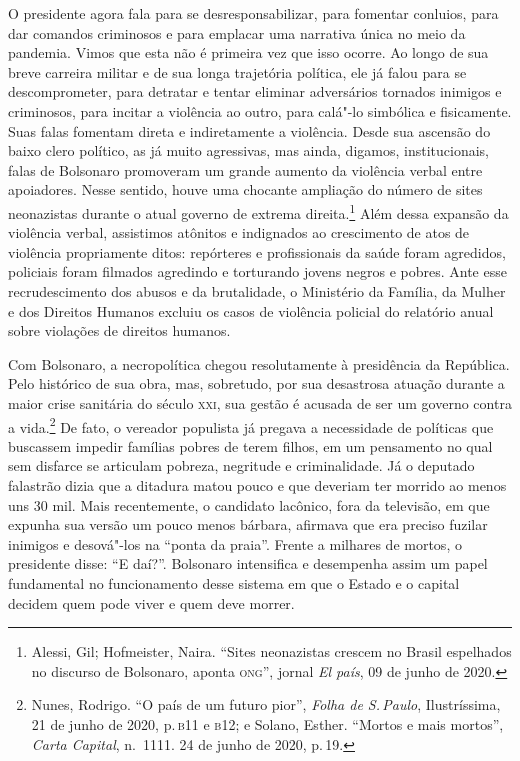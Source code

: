 O presidente agora fala para se desresponsabilizar, para fomentar
conluios, para dar comandos criminosos e para emplacar uma narrativa
única no meio da pandemia. Vimos que esta não é primeira vez que isso
ocorre. Ao longo de sua breve carreira militar e de sua longa trajetória
política, ele já falou para se descomprometer, para detratar e tentar
eliminar adversários tornados inimigos e criminosos, para incitar a
violência ao outro, para calá"-lo simbólica e fisicamente. Suas falas
fomentam direta e indiretamente a violência. Desde sua ascensão do baixo
clero político, as já muito agressivas, mas ainda, digamos,
institucionais, falas de Bolsonaro promoveram um grande aumento da
violência verbal entre apoiadores. Nesse sentido, houve uma chocante
ampliação do número de sites neonazistas durante o atual governo de
extrema direita.\footnote{Alessi, Gil; Hofmeister, Naira. ``Sites
  neonazistas crescem no Brasil espelhados no discurso de Bolsonaro,
  aponta \textsc{ong}'', jornal \emph{El país}, 09 de junho de 2020.}
Além dessa expansão da violência verbal, assistimos atônitos e
indignados ao crescimento de atos de violência propriamente ditos:
repórteres e profissionais da saúde foram agredidos, policiais foram
filmados agredindo e torturando jovens negros e pobres. Ante esse
recrudescimento dos abusos e da brutalidade, o Ministério da Família, da
Mulher e dos Direitos Humanos excluiu os casos de violência policial do
relatório anual sobre violações de direitos humanos.

Com Bolsonaro, a necropolítica chegou resolutamente à presidência da
República. Pelo histórico de sua obra, mas, sobretudo, por sua
desastrosa atuação durante a maior crise sanitária do século \textsc{xxi}, sua
gestão é acusada de ser um governo contra a vida.\footnote{Nunes,
  Rodrigo. ``O país de um futuro pior'', \emph{Folha de S.\,Paulo},
  Ilustríssima, 21 de junho de 2020, p.\,\textsc{b}11 e \textsc{b}12; e Solano, Esther.
  ``Mortos e mais mortos'', \emph{Carta Capital}, n.~1111. 24 de junho de
  2020, p.\,19.} De fato, o vereador populista já pregava a necessidade
de políticas que buscassem impedir famílias pobres de terem filhos, em
um pensamento no qual sem disfarce se articulam pobreza, negritude e
criminalidade. Já o deputado falastrão dizia que a ditadura matou pouco
e que deveriam ter morrido ao menos uns 30 mil. Mais recentemente, o
candidato lacônico, fora da televisão, em que expunha sua versão um
pouco menos bárbara, afirmava que era preciso fuzilar inimigos e
desová"-los na ``ponta da praia''. Frente a milhares de mortos, o
presidente disse: ``E daí?''. Bolsonaro intensifica e desempenha assim
um papel fundamental no funcionamento desse sistema em que o Estado e o
capital decidem quem pode viver e quem deve morrer.

